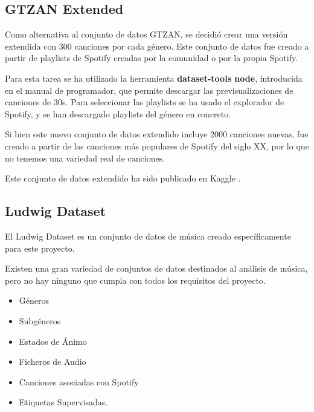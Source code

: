 \subsection{GTZAN Extended}\label{gtzan-extended}

Como alternativa al conjunto de datos GTZAN, se decidió crear una versión
extendida con 300 canciones por cada género. Este conjunto de datos fue
creado a partir de playlists de Spotify creadas por la comunidad o por la propia Spotify.

Para esta tarea se ha utilizado la herramienta \textbf{dataset-tools node}, introducida en el manual de programador, que permite descargar las previsualizaciones de canciones de 30s. Para seleccionar las playlists se ha usado el explorador de Spotify, y se han descargado playlists del género en concreto. 

Si bien este nuevo conjunto de datos extendido incluye 2000
canciones nuevas, fue creado a partir de las canciones más populares de
Spotify del siglo XX, por lo que no tenemos una variedad real de
canciones.

Este conjunto de datos extendido ha sido publicado en Kaggle \cite{GtzanExt16:online}.


\subsection{Ludwig Dataset}\label{ludwig-dataset} 

El Ludwig Dataset \cite{LudwigMu18:online} es un conjunto de datos de música creado
específicamente para este proyecto.

Existen una gran variedad de conjuntos de datos destinados al análisis
de música, pero no hay ninguno que cumpla con todos los requisitos del
proyecto.
\begin{itemize}

\itemsep0em
\item
  Géneros
\item
  Subgéneros
\item
  Estados de Ánimo
\item
  Ficheros de Audio
\item
  Canciones asociadas con Spotify
\item
  Etiquetas Supervisadas. 
\end{itemize}

